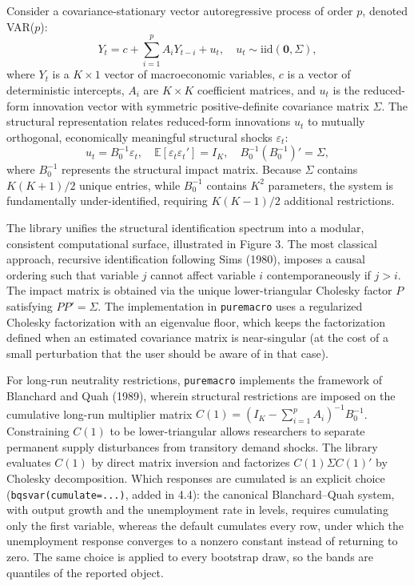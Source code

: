 \documentclass[11pt,letterpaper]{article}
\renewcommand{\_}{\pmunderscore\allowbreak}
\begin{document}
Consider a covariance-stationary vector autoregressive process of order \(p\), denoted VAR(\(p\)):
\[Y_t = c + \sum_{i=1}^p A_i Y_{t-i} + u_t, \quad u_t \sim \text{iid}(\mathbf{0}, \Sigma),\]
where \(Y_t\) is a \(K \times 1\) vector of macroeconomic variables, \(c\) is a vector of deterministic intercepts, \(A_i\) are \(K \times K\) coefficient matrices, and \(u_t\) is the reduced-form innovation vector with symmetric positive-definite covariance matrix \(\Sigma\). The structural representation relates reduced-form innovations \(u_t\) to mutually orthogonal, economically meaningful structural shocks \(\varepsilon_t\):
\[u_t = B_0^{-1} \varepsilon_t, \quad \mathbb{E}[\varepsilon_t \varepsilon_t'] = I_K, \quad B_0^{-1} (B_0^{-1})' = \Sigma,\]
where \(B_0^{-1}\) represents the structural impact matrix. Because \(\Sigma\) contains \(K(K+1)/2\) unique entries, while \(B_0^{-1}\) contains \(K^2\) parameters, the system is fundamentally under-identified, requiring \(K(K-1)/2\) additional restrictions.

The library unifies the structural identification spectrum into a modular, consistent computational surface, illustrated in Figure 3. The most classical approach, recursive identification following Sims (1980), imposes a causal ordering such that variable \(j\) cannot affect variable \(i\) contemporaneously if \(j > i\). The impact matrix is obtained via the unique lower-triangular Cholesky factor \(P\) satisfying \(P P' = \Sigma\). The implementation in \texttt{puremacro} uses a regularized Cholesky factorization with an eigenvalue floor, which keeps the factorization defined when an estimated covariance matrix is near-singular (at the cost of a small perturbation that the user should be aware of in that case).

For long-run neutrality restrictions, \texttt{puremacro} implements the framework of Blanchard and Quah (1989), wherein structural restrictions are imposed on the cumulative long-run multiplier matrix \(C(1) = \left(I_K - \sum_{i=1}^p A_i\right)^{-1} B_0^{-1}\). Constraining \(C(1)\) to be lower-triangular allows researchers to separate permanent supply disturbances from transitory demand shocks. The library evaluates \(C(1)\) by direct matrix inversion and factorizes \(C(1) \Sigma C(1)'\) by Cholesky decomposition. Which responses are cumulated is an explicit choice (\texttt{bq\_svar(cumulate=...)}, added in 4.4): the canonical Blanchard--Quah system, with output growth and the unemployment rate in levels, requires cumulating only the first variable, whereas the default cumulates every row, under which the unemployment response converges to a nonzero constant instead of returning to zero. The same choice is applied to every bootstrap draw, so the bands are quantiles of the reported object.
\end{document}

